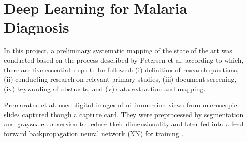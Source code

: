 \section{Deep Learning for Malaria Diagnosis}

In this project, a preliminary systematic mapping of the state of the art was conducted based on the process described by Petersen et al. according to which, there are five essential steps to be followed: (i) definition of research questions, (ii) conducting research on relevant primary studies, (iii) document screening, (iv) keywording of abstracts, and (v) data extraction and mapping.

Premaratne et al. used digital images of oil immersion views from microscopic slides captured though a capture card. They were preprocessed by segmentation and grayscale conversion to reduce their dimensionality and later fed into a feed forward backpropagation neural network (NN) for training \cite{Premaratne2006AFilms}.
